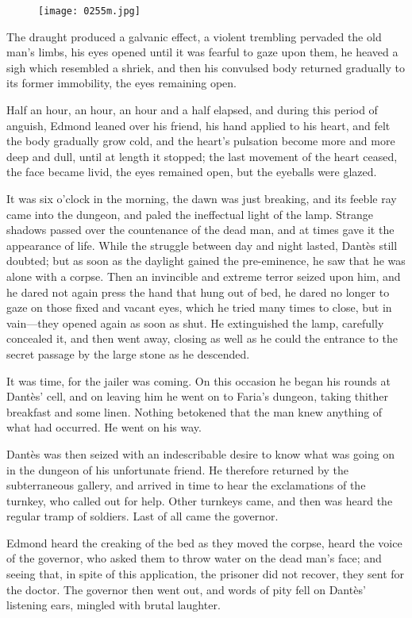 \begin{figure}[ht]
\texttt{[image: 0255m.jpg]}
\end{figure}

The draught produced a galvanic effect, a violent trembling pervaded
the old man’s limbs, his eyes opened until it was fearful to gaze upon
them, he heaved a sigh which resembled a shriek, and then his convulsed
body returned gradually to its former immobility, the eyes remaining
open.

Half an hour, an hour, an hour and a half elapsed, and during this
period of anguish, Edmond leaned over his friend, his hand applied to
his heart, and felt the body gradually grow cold, and the heart’s
pulsation become more and more deep and dull, until at length it
stopped; the last movement of the heart ceased, the face became livid,
the eyes remained open, but the eyeballs were glazed.

It was six o’clock in the morning, the dawn was just breaking, and its
feeble ray came into the dungeon, and paled the ineffectual light of
the lamp. Strange shadows passed over the countenance of the dead man,
and at times gave it the appearance of life. While the struggle between
day and night lasted, Dantès still doubted; but as soon as the daylight
gained the pre-eminence, he saw that he was alone with a corpse. Then
an invincible and extreme terror seized upon him, and he dared not
again press the hand that hung out of bed, he dared no longer to gaze
on those fixed and vacant eyes, which he tried many times to close, but
in vain—they opened again as soon as shut. He extinguished the lamp,
carefully concealed it, and then went away, closing as well as he could
the entrance to the secret passage by the large stone as he descended.

It was time, for the jailer was coming. On this occasion he began his
rounds at Dantès’ cell, and on leaving him he went on to Faria’s
dungeon, taking thither breakfast and some linen. Nothing betokened
that the man knew anything of what had occurred. He went on his way.

Dantès was then seized with an indescribable desire to know what was
going on in the dungeon of his unfortunate friend. He therefore
returned by the subterraneous gallery, and arrived in time to hear the
exclamations of the turnkey, who called out for help. Other turnkeys
came, and then was heard the regular tramp of soldiers. Last of all
came the governor.

Edmond heard the creaking of the bed as they moved the corpse, heard
the voice of the governor, who asked them to throw water on the dead
man’s face; and seeing that, in spite of this application, the prisoner
did not recover, they sent for the doctor. The governor then went out,
and words of pity fell on Dantès’ listening ears, mingled with brutal
laughter.

